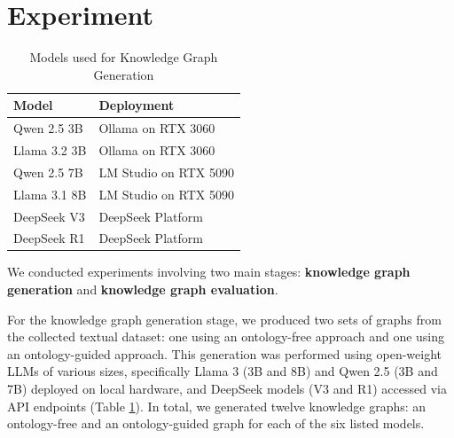\documentclass[a4, conference]{IEEEtran}
\begin{document}
\section{Experiment}
\label{sec:experiment}

\begin{table}[h]
    \centering
    \caption{Models used for Knowledge Graph Generation} %
    \label{tab:model_deployment}
    \begin{tabular}{ll}
        \hline
        Model        & Deployment            \\
        \hline
        Qwen 2.5 3B  & Ollama on RTX 3060    \\
        Llama 3.2 3B & Ollama on RTX 3060    \\
        Qwen 2.5 7B  & LM Studio on RTX 5090 \\
        Llama 3.1 8B & LM Studio on RTX 5090 \\
        DeepSeek V3  & DeepSeek Platform     \\
        DeepSeek R1  & DeepSeek Platform     \\
        \hline
    \end{tabular}
\end{table}


We conducted experiments involving two main stages: \textbf{knowledge graph generation} and \textbf{knowledge graph evaluation}.

For the knowledge graph generation stage, we produced two sets of graphs from the collected textual dataset: one using an ontology-free approach and one using an ontology-guided approach. This generation was performed using open-weight LLMs of various sizes, specifically Llama 3 \cite{grattafiori2024llama3herdmodels} (3B and 8B) and Qwen 2.5 \cite{qwen2025qwen25technicalreport} (3B and 7B) deployed on local hardware, and DeepSeek \cite{deepseekai2024deepseekv3technicalreport,deepseekai2025deepseekr1incentivizingreasoningcapability} models (V3 and R1) accessed via API endpoints (Table \ref{tab:model_deployment}). In total, we generated twelve knowledge graphs: an ontology-free and an ontology-guided graph for each of the six listed models.
\end{document}
